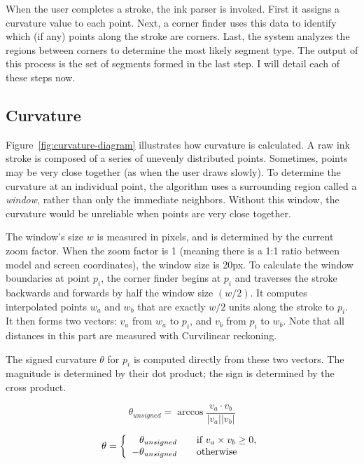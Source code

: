 When the user completes a stroke, the ink parser is invoked. First it
assigns a curvature value to each point. Next, a corner finder uses
this data to identify which (if any) points along the stroke are
corners. Last, the system analyzes the regions between corners to
determine the most likely segment type. The output of this process is
the set of segments formed in the last step. I will detail each of
these steps now.

\subsection{Curvature}



Figure~\ref{fig:curvature-diagram} illustrates how curvature is
calculated. A raw ink stroke is composed of a series of unevenly
distributed points. Sometimes, points may be very close together (as
when the user draws slowly). To determine the curvature at an
individual point, the algorithm uses a surrounding region called a
\textit{window}, rather than only the immediate neighbors. Without
this window, the curvature would be unreliable when points are very
close together.

The window's size $w$ is measured in pixels, and is determined by the
current zoom factor. When the zoom factor is 1 (meaning there is a 1:1
ratio between model and screen coordinates), the window size is
20px. To calculate the window boundaries at point $p_i$, the corner
finder begins at $p_i$ and traverses the stroke backwards and forwards
by half the window size $(w/2)$. It computes interpolated points $w_a$
and $w_b$ that are exactly $w/2$ units along the stroke to $p_i$. It
then forms two vectors: $v_a$ from $w_a$ to $p_i$, and $v_b$ from
$p_i$ to $w_b$. Note that all distances in this part are measured with
Curvilinear reckoning.

The signed curvature $\theta$ for $p_i$ is computed directly from
these two vectors. The magnitude is determined by their dot product;
the sign is determined by the cross product.

\begin{samepage}
\begin{equation}
  \theta_{unsigned} = \arccos \frac{v_a\cdot v_b}{|v_a| |v_b|}
\end{equation}

\begin{equation}
  \theta = \left\{ 
  \begin{array}{r l}
    \theta_{unsigned} & \quad \text{if } v_a \times v_b \geq 0\text{,}\\
    -\theta_{unsigned} & \quad \text{otherwise}\\
  \end{array} \right .
\end{equation}
\end{samepage}

